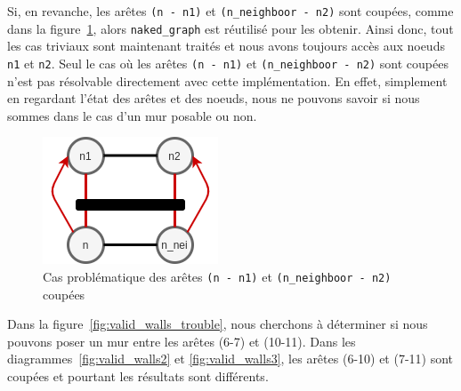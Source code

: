 \documentclass[a4paper]{article}
\begin{document}
Si, en revanche, les arêtes \texttt{(n~-~n1)} et \texttt{(n\_neighboor~-~n2)} sont coupées, comme dans la figure~\ref{fig:valid_walls_prob}, alors \texttt{naked\_graph} est réutilisé pour les obtenir. Ainsi donc, tout les cas triviaux sont maintenant traités et nous avons toujours accès aux noeuds \texttt{n1} et \texttt{n2}. Seul le cas où les arêtes \texttt{(n~-~n1)} et \texttt{(n\_neighboor~-~n2)} sont coupées n'est pas résolvable directement avec cette implémentation. En effet, simplement en regardant l'état des arêtes et des noeuds, nous ne pouvons savoir si nous sommes dans le cas d'un mur posable ou non. \\

\clearpage
\begin{figure}[ht]
    \centering
    \includegraphics[scale=0.75]{valid_walls_problem.png}
    \caption{Cas problématique des arêtes \texttt{(n - n1)} et \texttt{(n\_neighboor - n2)} coupées}
    \label{fig:valid_walls_prob}
\end{figure}

Dans la figure~\ref{fig:valid_walls_trouble}, nous cherchons à déterminer si nous pouvons poser un mur entre les arêtes (6-7) et (10-11). Dans les diagrammes~\ref{fig:valid_walls2} et \ref{fig:valid_walls3}, les arêtes (6-10) et (7-11) sont coupées et pourtant les résultats sont différents. \\
\end{document}
